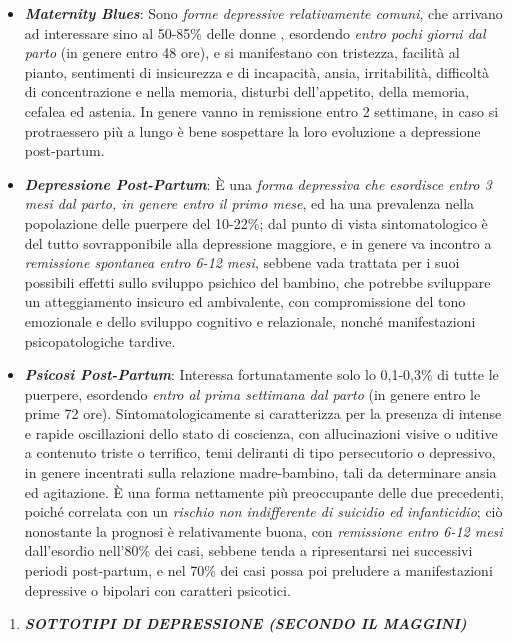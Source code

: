 \documentclass[]{article}
\begin{document}
\begin{itemize}
\item
  \textbf{\emph{Maternity Blues}}: Sono \emph{forme depressive
  relativamente comuni}, che arrivano ad interessare sino al 50-85\%
  delle donne , esordendo \emph{entro pochi giorni dal parto} (in genere
  entro 48 ore), e si manifestano con tristezza, facilità al pianto,
  sentimenti di insicurezza e di incapacità, ansia, irritabilità,
  difficoltà di concentrazione e nella memoria, disturbi dell'appetito,
  della memoria, cefalea ed astenia. In genere vanno in remissione entro
  2 settimane, in caso si protraessero più a lungo è bene sospettare la
  loro evoluzione a depressione post-partum.
\item
  \textbf{\emph{Depressione Post-Partum}}: È una \emph{forma depressiva
  che esordisce entro 3 mesi dal parto, in genere entro il primo mese},
  ed ha una prevalenza nella popolazione delle puerpere del 10-22\%; dal
  punto di vista sintomatologico è del tutto sovrapponibile alla
  depressione maggiore, e in genere va incontro a \emph{remissione
  spontanea entro 6-12 mesi}, sebbene vada trattata per i suoi possibili
  effetti sullo sviluppo psichico del bambino, che potrebbe sviluppare
  un atteggiamento insicuro ed ambivalente, con compromissione del tono
  emozionale e dello sviluppo cognitivo e relazionale, nonché
  manifestazioni psicopatologiche tardive.
\item
  \textbf{\emph{Psicosi Post-Partum}}: Interessa fortunatamente solo lo
  0,1-0,3\% di tutte le puerpere, esordendo \emph{entro al prima
  settimana dal parto} (in genere entro le prime 72 ore).
  Sintomatologicamente si caratterizza per la presenza di intense e
  rapide oscillazioni dello stato di coscienza, con allucinazioni visive
  o uditive a contenuto triste o terrifico, temi deliranti di tipo
  persecutorio o depressivo, in genere incentrati sulla relazione
  madre-bambino, tali da determinare ansia ed agitazione. È una forma
  nettamente più preoccupante delle due precedenti, poiché correlata con
  un \emph{rischio non indifferente di suicidio ed infanticidio}; ciò
  nonostante la prognosi è relativamente buona, con \emph{remissione
  entro 6-12 mesi} dall'esordio nell'80\% dei casi, sebbene tenda a
  ripresentarsi nei successivi periodi post-partum, e nel 70\% dei casi
  possa poi preludere a manifestazioni depressive o bipolari con
  caratteri psicotici.
\end{itemize}

\begin{enumerate}
\def\labelenumi{\arabic{enumi}.}
\item
  \textbf{\emph{SOTTOTIPI DI DEPRESSIONE (SECONDO IL MAGGINI)}}
\end{enumerate}
\end{document}
